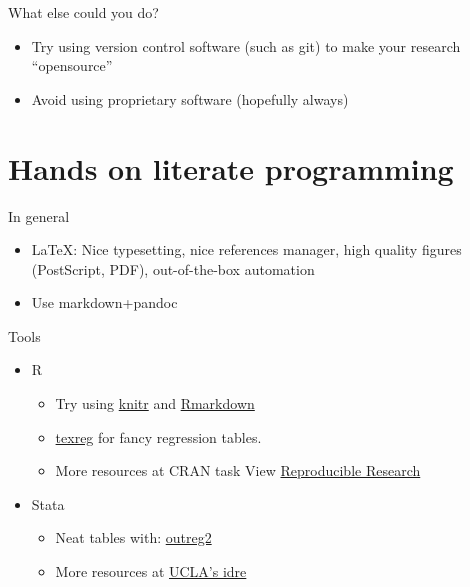 \begin{frame}{What else could you do?}

\begin{itemize}
\tightlist
\item
  Try using version control software (such as git) to make your research
  ``opensource''
\item
  Avoid using proprietary software (hopefully always)
\end{itemize}

\end{frame}

\section{Hands on literate
programming}\label{hands-on-literate-programming}

\begin{frame}{In general}

\begin{itemize}
\tightlist
\item
  LaTeX: Nice typesetting, nice references manager, high quality figures
  (PostScript, PDF), out-of-the-box automation
\item
  Use markdown+pandoc
\end{itemize}

\end{frame}

\begin{frame}{Tools}

\begin{itemize}
\tightlist
\item
  R

  \begin{itemize}
  \tightlist
  \item
    Try using
    \href{https://cran.r-project.org/web/packages/knitr/index.html}{knitr}
    and
    \href{https://cran.r-project.org/web/packages/rmarkdown/index.html}{Rmarkdown}
  \item
    \href{https://cran.r-project.org/web/packages/texreg/index.html}{texreg}
    for fancy regression tables.
  \item
    More resources at CRAN task View
    \href{https://cran.r-project.org/web/views/ReproducibleResearch.html}{Reproducible
    Research}
  \end{itemize}
\item
  Stata

  \begin{itemize}
  \tightlist
  \item
    Neat tables with:
    \href{https://ideas.repec.org/c/boc/bocode/s456416.html}{outreg2}
  \item
    More resources at
    \href{http://www.ats.ucla.edu/stat/stata/latex/}{UCLA's idre}
  \end{itemize}
\end{itemize}

\end{frame}

